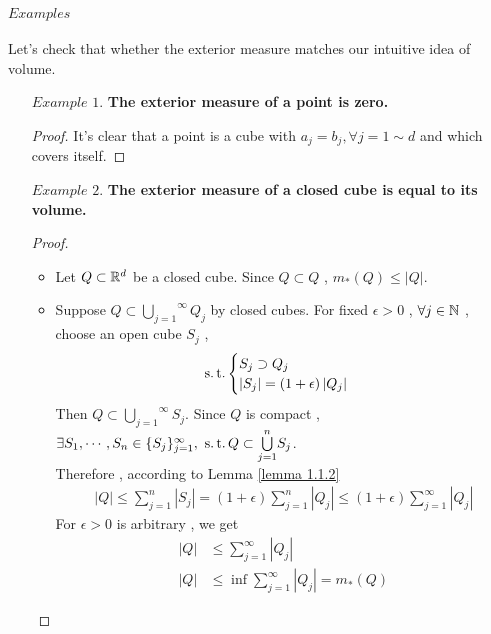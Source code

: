 \paragraph{$Examples$}
	Let's check that whether the exterior measure matches our intuitive idea of volume.
	\begin{enumerate}
		\item[$Example \,\, 1 .$]\textbf{The exterior measure of a point is zero.}
		\begin{proof}
			It's clear that a point is a cube with $a_j = b_j , \forall j = 1 \sim d$ and which covers itself.
		\end{proof}
	
		\item[$Example \,\, 2 .$]\textbf{The exterior measure of a closed cube is equal to its volume.}
		\begin{proof}
			\begin{itemize}
				\item Let $Q \subset \mathbb{R}^d$ be a closed cube. Since $Q \subset Q$ , $m_{*}(Q) \leq \left| Q \right|.$
				
				\item Suppose $Q \subset \overset{\infty}{\underset{j = 1}{\bigcup}}{Q_j}$ by closed cubes. For fixed $\epsilon > 0$ , $\forall j \in \mathbb{N}$ , choose an open cube $S_j$ ,
				\begin{align}
					\operatorname{s.t.}
					\begin{cases}
						S_j \supset Q_j\\
						\left| S_j \right| = (1 + \epsilon) \left| Q_j \right|
					\end{cases}
				\end{align}
				Then $Q \subset \overset{\infty}{\underset{j = 1}{\bigcup}}{S_j}$. Since $Q$ is compact , $\exists S_1 , \cdots , S_n \in \{ S_j \}_{j = 1}^{\infty} , \,\, \operatorname{s.t.} Q \subset \overset{n}{\underset{j = 1}{\bigcup}}{S_j}$.\\
				Therefore , according to Lemma \ref{lemma 1.1.2}
				\begin{align}
					\left| Q \right| \leq \sum_{j = 1}^{n}{\left| S_j \right|} = (1 + \epsilon)\sum_{j = 1}^{n}{\left| Q_j \right|} \leq (1 + \epsilon)\sum_{j = 1}^{\infty}{\left| Q_j \right|}
				\end{align}
				For $\epsilon > 0$ is arbitrary , we get
				\begin{align}
					\left| Q \right| &\leq \sum_{j = 1}^{\infty}{\left| Q_j \right|} \\
					\left| Q \right| &\leq \inf{\sum_{j = 1}^{\infty}{\left| Q_j \right|}} = m_{*}(Q)
				\end{align}
			\end{itemize}
		\end{proof}
	

\end{enumerate}

